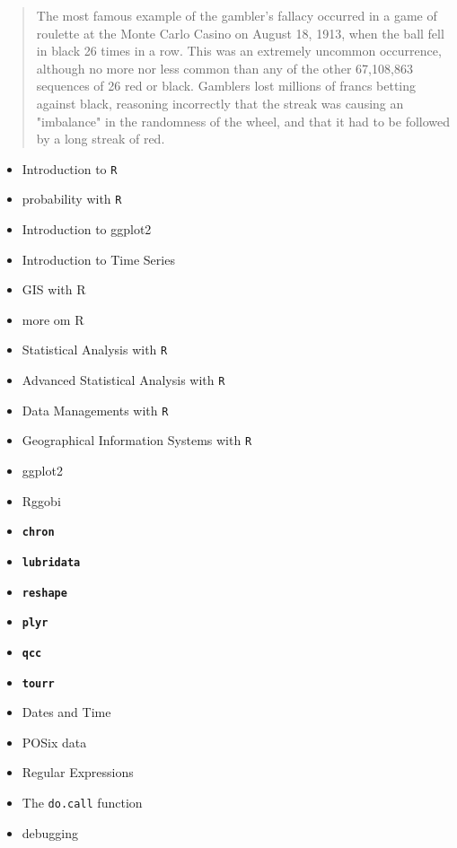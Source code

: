 \begin{quote}
The most famous example of the gambler's fallacy occurred in a game 
of roulette at the Monte Carlo Casino on August 18, 1913, when the ball fell in black 26 times in a row. This was an extremely uncommon occurrence, although no more nor less common than any of the other 67,108,863 sequences of 26 red or black. Gamblers lost millions of francs betting against black, reasoning incorrectly that the streak was causing an "imbalance" in the randomness of the wheel, and that it had to be followed by a long streak of red.
\end{quote}


\begin{itemize}
\item Introduction to \texttt{R}
\item probability with \texttt{R}
\item Introduction to ggplot2
\item Introduction to Time Series
\item GIS with R
\item more om R

\end{itemize}




\begin{itemize}
\item Statistical Analysis with \texttt{R}
\item Advanced Statistical Analysis with \texttt{R}
\item Data Managements with \texttt{R}
\item Geographical Information Systems with \texttt{R}
\item ggplot2 
\item Rggobi
\end{itemize}
\begin{itemize}
\item \textbf{\texttt{chron}}
\item \textbf{\texttt{lubridata}}
\item \textbf{\texttt{reshape}}
\item \textbf{\texttt{plyr}}
\item \textbf{\texttt{qcc}}
\item \textbf{\texttt{tourr}}
\end{itemize}
\begin{itemize}
\item Dates and Time
\item POSix data
\item Regular Expressions
\item The \texttt{do.call} function
\item debugging
\end{itemize}

